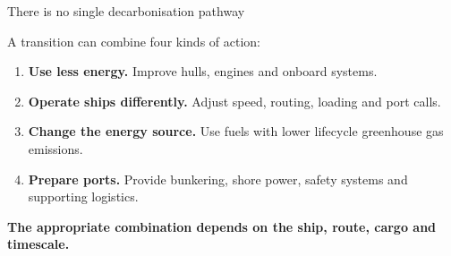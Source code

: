 \documentclass[aspectratio=169,11pt]{beamer}
\begin{document}
\begin{frame}{There is no single decarbonisation pathway}
  \vspace{0.12cm}
  {\color{Ink}\fontsize{11.7}{15.2}\selectfont
    A transition can combine four kinds of action:
    \vspace{0.18cm}
    \begin{enumerate}
      \setlength{\itemsep}{0.19cm}
      \item \textbf{Use less energy.} Improve hulls, engines and onboard
        systems.
      \item \textbf{Operate ships differently.} Adjust speed, routing,
        loading and port calls.
      \item \colorbox{HighlightYellow}{\textbf{Change the energy source.}}
        Use fuels with lower lifecycle greenhouse gas emissions.
      \item \textbf{Prepare ports.} Provide bunkering, shore power, safety
        systems and supporting logistics.
    \end{enumerate}
  }

  \vfill
  {\color{Navy}\fontsize{10.5}{13.5}\selectfont\bfseries
    The appropriate combination depends on the ship, route, cargo and
    timescale.
  \par}
\end{frame}
\end{document}
